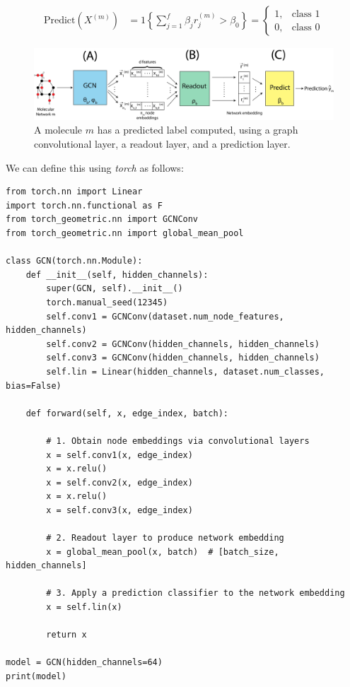 \begin{align*}\text{Predict}\left(X^{(m)}\right) &= 
    \mathfrak 1\left\{\sum_{j = 1}^f \beta_j r_j^{(m)} > \beta_0\right\} = \begin{cases}
        1, & \text{class $1$} \\
        0, & \text{class $0$}
    \end{cases}
\end{align*}

\begin{figure}
    \centering
    \includegraphics[width=\linewidth]{next/Images/gnn.png}
    \caption{A molecule $m$ has a predicted label computed, using a graph convolutional layer, a readout layer, and a prediction layer.}
    \label{fig:next:gnn:gnn}
\end{figure}

We can define this using \textit{torch} as follows:

\begin{lstlisting}[style=python]
from torch.nn import Linear
import torch.nn.functional as F
from torch_geometric.nn import GCNConv
from torch_geometric.nn import global_mean_pool

class GCN(torch.nn.Module):
    def __init__(self, hidden_channels):
        super(GCN, self).__init__()
        torch.manual_seed(12345)
        self.conv1 = GCNConv(dataset.num_node_features, hidden_channels)
        self.conv2 = GCNConv(hidden_channels, hidden_channels)
        self.conv3 = GCNConv(hidden_channels, hidden_channels)
        self.lin = Linear(hidden_channels, dataset.num_classes, bias=False)

    def forward(self, x, edge_index, batch):

        # 1. Obtain node embeddings via convolutional layers
        x = self.conv1(x, edge_index)
        x = x.relu()
        x = self.conv2(x, edge_index)
        x = x.relu()
        x = self.conv3(x, edge_index)

        # 2. Readout layer to produce network embedding
        x = global_mean_pool(x, batch)  # [batch_size, hidden_channels]

        # 3. Apply a prediction classifier to the network embedding
        x = self.lin(x)

        return x

model = GCN(hidden_channels=64)
print(model)
\end{lstlisting}


